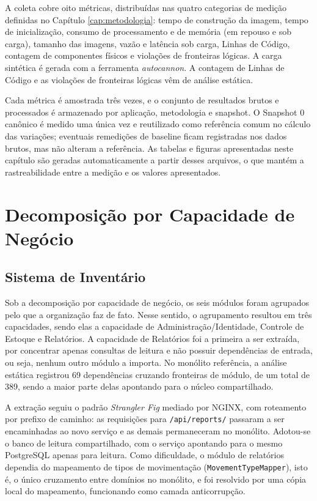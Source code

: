A coleta cobre oito métricas, distribuídas nas quatro categorias de medição definidas no Capítulo \ref{cap:metodologia}: tempo de construção da imagem, tempo de inicialização, consumo de processamento e de memória (em repouso e sob carga), tamanho das imagens, vazão e latência sob carga, Linhas de Código, contagem de componentes físicos e violações de fronteiras lógicas. A carga sintética é gerada com a ferramenta \emph{autocannon}. A contagem de Linhas de Código e as violações de fronteiras lógicas vêm de análise estática.

Cada métrica é amostrada três vezes, e o conjunto de resultados brutos e processados é armazenado por aplicação, metodologia e snapshot. O Snapshot 0 canônico é medido uma única vez e reutilizado como referência comum no cálculo das variações; eventuais remedições de baseline ficam registradas nos dados brutos, mas não alteram a referência. As tabelas e figuras apresentadas neste capítulo são geradas automaticamente a partir desses arquivos, o que mantém a rastreabilidade entre a medição e os valores apresentados.


\section{Decomposição por Capacidade de Negócio}
\label{sec:metodologia_capacidade}

\subsection*{Sistema de Inventário}

Sob a decomposição por capacidade de negócio, os seis módulos foram agrupados pelo que a organização faz de fato. Nesse sentido, o agrupamento resultou em três capacidades, sendo elas a capacidade de Administração/Identidade, Controle de Estoque e Relatórios. A capacidade de Relatórios foi a primeira a ser extraída, por concentrar apenas consultas de leitura e não possuir dependências de entrada, ou seja, nenhum outro módulo a importa. No monólito referência, a análise estática registrou 69 dependências cruzando fronteiras de módulo, de um total de 389, sendo a maior parte delas apontando para o núcleo compartilhado.

A extração seguiu o padrão \textit{Strangler Fig} mediado por NGINX, com roteamento por prefixo de caminho: as requisições para \texttt{/api/reports/} passaram a ser encaminhadas ao novo serviço e as demais permaneceram no monólito. Adotou-se o banco de leitura compartilhado, com o serviço apontando para o mesmo PostgreSQL apenas para leitura. Como dificuldade, o módulo de relatórios dependia do mapeamento de tipos de movimentação (\texttt{MovementTypeMapper}), isto é, o único cruzamento entre domínios no monólito, e foi resolvido por uma cópia local do mapeamento, funcionando como camada anticorrupção.

